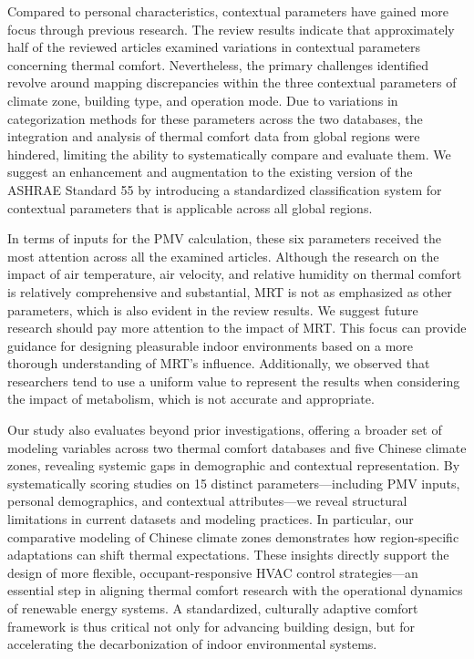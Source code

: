 \documentclass[final,3p,times,12pt]{elsarticle}
\begin{document}
Compared to personal characteristics, contextual parameters have gained more focus through previous research. The review results indicate that approximately half of the reviewed articles examined variations in contextual parameters concerning thermal comfort. Nevertheless, the primary challenges identified revolve around mapping discrepancies within the three contextual parameters of climate zone, building type, and operation mode. Due to variations in categorization methods for these parameters across the two databases, the integration and analysis of thermal comfort data from global regions were hindered, limiting the ability to systematically compare and evaluate them. We suggest an enhancement and augmentation to the existing version of the ASHRAE Standard 55 by introducing a standardized classification system for contextual parameters that is applicable across all global regions.

In terms of inputs for the PMV calculation, these six parameters received the most attention across all the examined articles. Although the research on the impact of air temperature, air velocity, and relative humidity on thermal comfort is relatively comprehensive and substantial, MRT is not as emphasized as other parameters, which is also evident in the review results. We suggest future research should pay more attention to the impact of MRT. This focus can provide guidance for designing pleasurable indoor environments based on a more thorough understanding of MRT's influence. Additionally, we observed that researchers tend to use a uniform value to represent the results when considering the impact of metabolism, which is not accurate and appropriate.

Our study also evaluates beyond prior investigations, offering a broader set of modeling variables across two thermal comfort databases and five Chinese climate zones, revealing systemic gaps in demographic and contextual representation. By systematically scoring studies on 15 distinct parameters—including PMV inputs, personal demographics, and contextual attributes—we reveal structural limitations in current datasets and modeling practices. In particular, our comparative modeling of Chinese climate zones demonstrates how region-specific adaptations can shift thermal expectations. These insights directly support the design of more flexible, occupant-responsive HVAC control strategies—an essential step in aligning thermal comfort research with the operational dynamics of renewable energy systems. A standardized, culturally adaptive comfort framework is thus critical not only for advancing building design, but for accelerating the decarbonization of indoor environmental systems.
\end{document}
